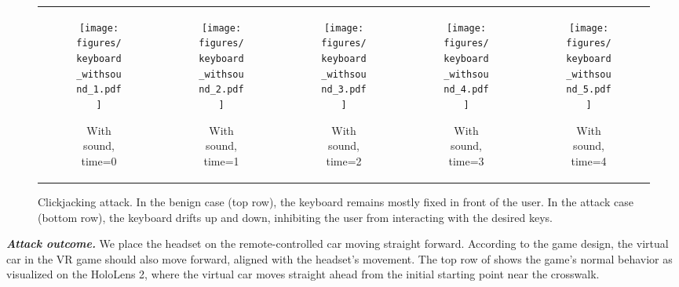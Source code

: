 \begin{figure*}[h]
\begin{tabular}{ccccc}
        \begin{subfigure}[b]{0.18\textwidth}
            \centering
            \texttt{[image: figures/keyboard\_withsound\_1.pdf]}
            \caption{With sound, time=0}
            \label{subfig:keyboard_withsound_frame1}
        \end{subfigure} &
        \begin{subfigure}[b]{0.18\textwidth}
            \centering
            \texttt{[image: figures/keyboard\_withsound\_2.pdf]}
            \caption{With sound, time=1}
            \label{subfig:keyboard_withsound_frame2}
        \end{subfigure} &
        \begin{subfigure}[b]{0.18\textwidth}
            \centering
            \texttt{[image: figures/keyboard\_withsound\_3.pdf]}
            \caption{With sound, time=2}
            \label{subfig:keyboard_withsound_frame3}
        \end{subfigure} &
        \begin{subfigure}[b]{0.18\textwidth}
            \centering
            \texttt{[image: figures/keyboard\_withsound\_4.pdf]}
            \caption{With sound, time=3}
            \label{subfig:keyboard_withsound_frame4}
        \end{subfigure} &
        \begin{subfigure}[b]{0.18\textwidth}
            \centering
            \texttt{[image: figures/keyboard\_withsound\_5.pdf]}
            \caption{With sound, time=4}
            \label{subfig:keyboard_withsound_frame5}
        \end{subfigure}
    \end{tabular}
    \caption{
    Clickjacking attack. In the benign case (top row), the keyboard remains mostly fixed in front of the user.
    In the attack case (bottom row), the keyboard drifts up and down, inhibiting the user from interacting with the desired keys.
    }
    \label{fig:keyboard}
\end{figure*}


\noindent \emph{\textbf{Attack outcome.}} We place the headset on the remote-controlled car moving straight forward. According to the game design, the virtual car in the VR game should also move forward, aligned with the headset’s movement. 
The top row of  shows the game's normal behavior as visualized on the HoloLens 2, where the virtual car moves straight ahead from the initial starting point near the crosswalk.

